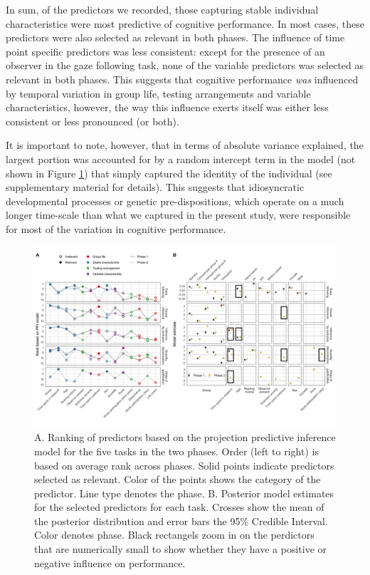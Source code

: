 \documentclass[
  man,floatsintext]{apa6}
\begin{document}
In sum, of the predictors we recorded, those capturing stable individual characteristics were most predictive of cognitive performance. In most cases, these predictors were also selected as relevant in both phases. The influence of time point specific predictors was less consistent: except for the presence of an observer in the gaze following task, none of the variable predictors was selected as relevant in both phases. This suggests that cognitive performance \emph{was} influenced by temporal variation in group life, testing arrangements and variable characteristics, however, the way this influence exerts itself was either less consistent or less pronounced (or both).

It is important to note, however, that in terms of absolute variance explained, the largest portion was accounted for by a random intercept term in the model (not shown in Figure \ref{fig:ppiplot}) that simply captured the identity of the individual (see supplementary material for details). This suggests that idiosyncratic developmental processes or genetic pre-dispositions, which operate on a much longer time-scale than what we captured in the present study, were responsible for most of the variation in cognitive performance.

\begin{figure}

{\centering \includegraphics[width=1\linewidth]{./figures/ppi3_i4} 

}

\caption{A. Ranking of predictors based on the projection predictive inference model for the five tasks in the two phases. Order (left to right) is based on average rank across phases. Solid points indicate predictors selected as relevant. Color of the points shows the category of the predictor. Line type denotes the phase. B. Posterior model estimates for the selected predictors for each task. Crosses show the mean of the posterior distribution and error bars the 95\% Credible Interval. Color denotes phase. Black rectangels zoom in on the perdictors that are numerically small to show whether they have a positive or negative influence on performance.}\label{fig:ppiplot}
\end{figure}
\end{document}
